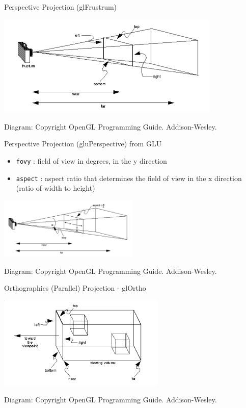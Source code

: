 \documentclass[aspectratio=1610,xcolor=dvipsnames,t]{beamer}
\newcommand{\showcode}[1]{\begin{mdframed}[style=code] %
                          \end{mdframed}%
}
\begin{document}
\begin{frame}{Perspective Projection (glFrustrum)}
    \showcode{frustrum.c} 
    \begin{center}
        \includegraphics[width=0.8\textwidth]{frustrum} 
    \end{center} 
    \tiny
    Diagram: Copyright OpenGL Programming Guide. Addison-Wesley. 
    \normalsize
\end{frame} 

\begin{frame}{Perspective Projection (gluPerspective) from GLU} 
    \showcode{perspective.c} 
    \begin{itemize} 
        \item \texttt{fovy} : field of view in degrees, in the y direction
        \item \texttt{aspect} : aspect ratio that determines the field of view in
          the x direction (ratio of width to height)
    \end{itemize} 
    \begin{center}
        \includegraphics[width=0.5\textwidth]{perspective} 
    \end{center} 
    \tiny
    Diagram: Copyright OpenGL Programming Guide. Addison-Wesley. 
    \normalsize
\end{frame} 

\begin{frame}{Orthographics (Parallel) Projection - glOrtho} 
    \showcode{ortho.c} 
     \begin{center}
         \includegraphics[width=0.6\textwidth]{ortho} 
    \end{center} 
    \tiny
    Diagram: Copyright OpenGL Programming Guide. Addison-Wesley. 
    \normalsize
\end{frame} 
\end{document}
